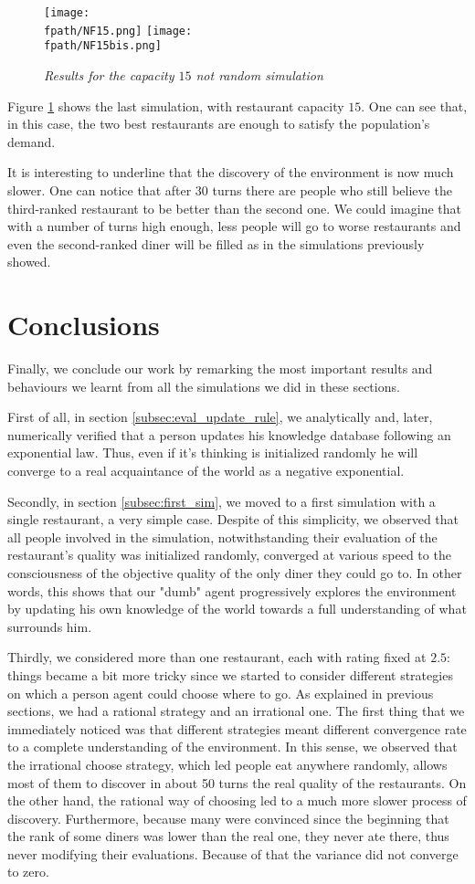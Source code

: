 \documentclass[10pt,a4paper,usenatbib]{article}
\newcommand{\fpath}{./Figs/}
\begin{document}
\begin{figure}[!htb]
\texttt{[image: \\fpath/NF15.png]}
\texttt{[image: \\fpath/NF15bis.png]}
\caption{\small \textit{Results for the capacity $15$ not random simulation}}
\label{fig:Cap15NR}
\end{figure}

Figure \ref{fig:Cap15NR} shows the last simulation, with restaurant capacity $15$. One can see that, in this case, the two best restaurants are enough to satisfy the population's demand.

It is interesting to underline that the discovery of the environment is now much slower. One can notice that after $30$ turns there are people who still believe the third-ranked restaurant to be better than the second one. We could imagine that with a number of turns high enough, less people will go to worse restaurants and even the second-ranked diner will be filled as in the simulations previously showed. 

\section{Conclusions}
Finally, we conclude our work by remarking the most important results and behaviours we learnt from all the simulations we did in these sections.

First of all, in section \ref{subsec:eval_update_rule}, we analytically and, later, numerically verified that a person updates his knowledge database following an exponential law. Thus, even if it's thinking is initialized randomly he will converge to a real acquaintance of the world as a negative exponential.

Secondly, in section \ref{subsec:first_sim}, we moved to a first simulation with a single restaurant, a very simple case. Despite of this simplicity, we observed that all people involved in the simulation, notwithstanding their evaluation of the restaurant's quality was initialized randomly, converged at various speed to the consciousness of the objective quality of the only diner they could go to. In other words, this shows that our "dumb" agent progressively explores the environment by updating his own knowledge of the world towards a full understanding of what surrounds him.

Thirdly, we considered more than one restaurant, each with rating fixed at $2.5$: things became a bit more tricky since we started to consider different strategies on which a person agent could choose where to go. As explained in previous sections, we had a rational strategy and an irrational one. The first thing that we immediately noticed was that different strategies meant different convergence rate to a complete understanding of the environment. In this sense, we observed that the irrational choose strategy, which led people eat anywhere randomly, allows most of them to discover in about 50 turns the real quality of the restaurants. On the other hand, the rational way of choosing led to a much more slower process of discovery. Furthermore, because many were convinced since the beginning that the rank of some diners was lower than the real one, they never ate there, thus never modifying their evaluations. Because of that the variance did not converge to zero.
\end{document}
